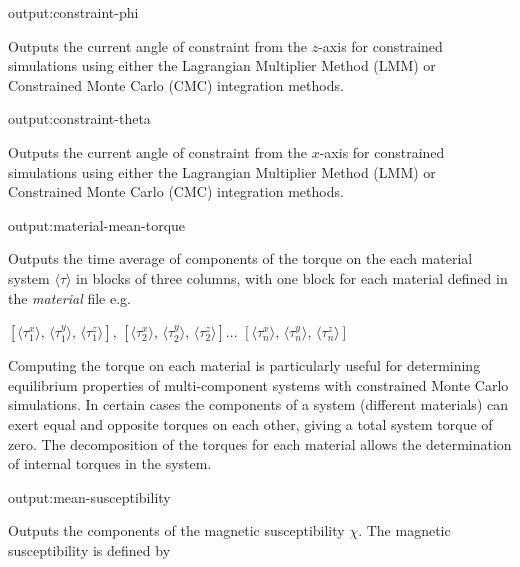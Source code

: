 {\zicf output:constraint-phi} Outputs the current angle of constraint from the $z$-axis for constrained simulations using either the Lagrangian Multiplier Method (LMM) or Constrained Monte Carlo (CMC) integration methods.

{\zicf output:constraint-theta} Outputs the current angle of constraint from the $x$-axis for constrained simulations using either the Lagrangian Multiplier Method (LMM) or Constrained Monte Carlo (CMC) integration methods.



{\zicf output:material-mean-torque} Outputs the time average of components of the torque on the each material system $\langle\tau\rangle$ in blocks of three columns, with one block for each material defined in the \textit{material} file e.g.

\begin{center}
$\left[ \langle\tau_1^x \rangle \right.$, $\langle\tau_1^y \rangle$, $\left. \langle\tau_1^z \rangle \right]$,
$\left[ \langle\tau_2^x \rangle \right.$, $\langle\tau_2^y \rangle$, $\left. \langle\tau_2^z \rangle \right]$...
$\left[ \langle\tau_n^x \rangle \right.$, $\langle\tau_n^y \rangle$, $\left. \langle\tau_n^z \rangle \right]$
\end{center}

Computing the torque on each material is particularly useful for determining equilibrium properties of multi-component systems with constrained Monte Carlo simulations. In certain cases the components of a system (different materials) can exert equal and opposite torques on each other, giving a total system torque of zero. The decomposition of the torques for each material allows the determination of internal torques in the system.

{\zicf output:mean-susceptibility} Outputs the components of the magnetic susceptibility $\chi$. The magnetic susceptibility is defined by

